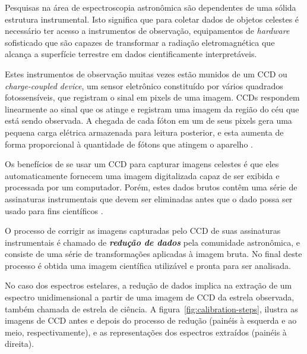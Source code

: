 Pesquisas na área de espectroscopia astronômica são dependentes de uma sólida estrutura instrumental. Isto significa que para coletar dados de objetos celestes é necessário ter acesso a instrumentos de observação, equipamentos de \textit{hardware} sofisticado que são capazes de transformar a radiação eletromagnética que alcança a superfície terrestre em dados cientificamente interpretáveis.

Estes instrumentos de observação muitas vezes estão munidos de um CCD ou \textit{charge-coupled device}, um sensor eletrônico constituído por vários quadrados fotossensíveis, que registram o sinal em pixels de uma imagem. CCDs respondem linearmente ao sinal que os atinge e registram uma imagem da região do céu que está sendo observada. A chegada de cada fóton em um de seus pixels gera uma pequena carga elétrica armazenada para leitura posterior, e esta aumenta de forma proporcional à quantidade de fótons que atingem o aparelho \citep{davenhall20012}.

Os benefícios de se usar um CCD para capturar imagens celestes é que eles automaticamente fornecem uma imagem digitalizada capaz de ser exibida e processada por um computador. Porém, estes dados brutos contêm uma série de assinaturas instrumentais que devem ser eliminadas antes que o dado possa ser usado para fins científicos \citep{davenhall20012}.  

O processo de corrigir as imagens capturadas pelo CCD de suas assinaturas instrumentais é chamado de \textbf{\textit{redução de dados}} pela comunidade astronômica, e consiste de uma série de transformações aplicadas à imagem bruta. No final deste processo é obtida uma imagem científica utilizável e pronta para ser analisada.

No caso dos espectros estelares, a redução de dados implica na extração de um espectro unidimensional a partir de uma imagem de CCD da estrela observada, também chamada de estrela de ciência. A figura~\ref{fig:calibration-steps}, ilustra as imagens de CCD antes e depois do processo de redução (painéis à esquerda e ao meio, respectivamente), e as representações dos espectros extraídos (painéis à direita).


